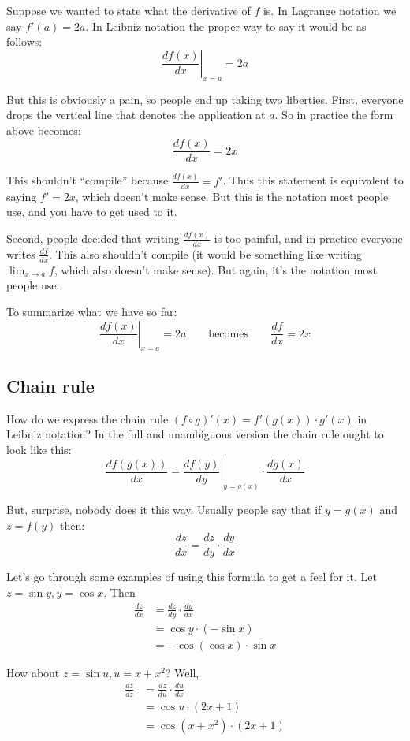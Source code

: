 Suppose we wanted to state what the derivative of $f$ is. In Lagrange
notation we say $f'(a)=2a$. In Leibniz notation the proper way to say
it would be as follows:
\[\left.\frac{df(x)}{dx}\right|_{x=a}=2a\]

But this is obviously a pain, so people end up taking two liberties.
First, everyone drops the vertical line that denotes the application
at $a$. So in practice the form above becomes:
\[\frac{df(x)}{dx}=2x\]

This shouldn't ``compile'' because $\frac{df(x)}{dx}=f'$. Thus this
statement is equivalent to saying $f'=2x$, which doesn't make sense.
But this is the notation most people use, and you have to get used to
it.

\vs

Second, people decided that writing $\frac{df(x)}{dx}$ is too painful,
and in practice everyone writes $\frac{df}{dx}$. This also shouldn't
compile (it would be something like writing $\lim_{x\to a}f$, which also
doesn't make sense). But again, it's the notation most people use.

\vs

To summarize what we have so far:
\[\left.\frac{df(x)}{dx}\right|_{x=a}=2a \qquad\text{becomes}\qquad \frac{df}{dx}=2x\]

\subsection{Chain rule}

How do we express the chain rule $(f\circ g)'(x)=f'(g(x))\cdot g'(x)$ in
Leibniz notation? In the full and unambiguous version the chain rule
ought to look like this:
\[\frac{d f(g(x))}{dx} = \left. \frac{d f(y)}{dy} \right|_{y=g(x)} \cdot
  \frac{d g(x)}{dx}\]

But, surprise, nobody does it this way. Usually people say that if
$y=g(x)$ and $z=f(y)$ then:
\[\frac{dz}{dx}=\frac{dz}{dy}\cdot \frac{dy}{dx}\]

Let's go through some examples of using this formula to get a feel for
it. Let $z=\sin y, y=\cos x$. Then
\begin{align*}
  \frac{dz}{dx}&=\frac{dz}{dy}\cdot \frac{dy}{dx}\\
  &=\cos y \cdot (-\sin x)\\
  &=-\cos (\cos x) \cdot \sin x
\end{align*}

How about $z=\sin u, u=x+x^2$? Well,
\begin{align*}
  \frac{dz}{dz}&=\frac{dz}{du}\cdot \frac{du}{dx}\\
               &=\cos u \cdot (2x+1)\\
               &=\cos (x+x^2)\cdot(2x+1)
\end{align*}


